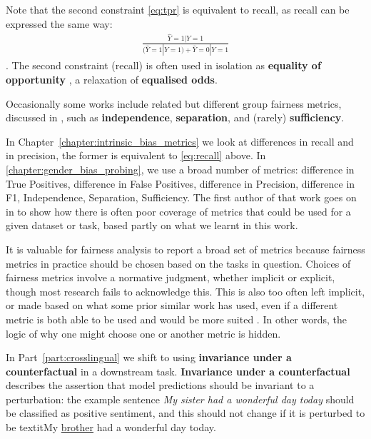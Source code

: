 Note that the second constraint \ref{eq:tpr} is equivalent to recall, as recall can be expressed the same way:
\begin{align}\label{eq:recall}
    \frac{\hat{Y} = 1 | Y=1}{(\hat{Y} = 1 | Y=1) + \hat{Y} = 0 | Y=1}
\end{align}.
The second constraint (recall) is often used in isolation as \textbf{equality of opportunity} \citep{hardt2016equality}, a relaxation of \textbf{equalised odds}. 

Occasionally some works include related but different group fairness metrics, discussed in \citet{barocas-hardt-narayanan}, such as \textbf{independence}, \textbf{separation}, and (rarely) \textbf{sufficiency}. 


In Chapter~\ref{chapter:intrinsic_bias_metrics} we look at differences in recall and in precision, the former is equivalent to \ref{eq:recall} above. In \ref{chapter:gender_bias_probing}, we use a broad number of metrics: difference in True Positives, difference in False Positives, difference in Precision, difference in F1, Independence, Separation, Sufficiency. The first author of that work goes on in \citet{orgad-belinkov-2022-choose} to show how there is often poor coverage of metrics that could be used for a given dataset or task, based partly on what we learnt in this work. 

It is valuable for fairness analysis to report a broad set of metrics because fairness metrics in practice should be chosen based on the tasks in question. 
Choices of fairness metrics involve a normative judgment, whether implicit or explicit, though most research fails to acknowledge this. This is also too often left implicit, or made based on what some prior similar work has used, even if a different metric is both able to be used and would be more suited \citep{orgad-belinkov-2022-choose}. In other words, the logic of why one might choose one or another metric is hidden. 

In Part~\ref{part:crosslingual} we shift to using \textbf{invariance under a counterfactual} in a downstream task. \textbf{Invariance under a counterfactual} describes the assertion that model predictions should be invariant to a perturbation: the example sentence \textit{My sister had a wonderful day today} should be classified as positive sentiment, and this should not change if it is perturbed to be textit{My \underline{brother} had a wonderful day today}.

